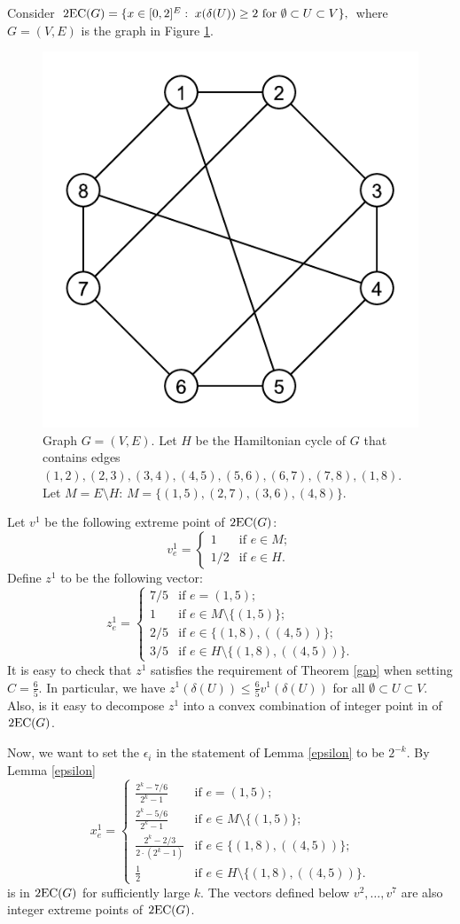 \begin{example}\label{epslimit}

Consider  $\operatorname{2EC}(G) = \{x\in [0,2]^E: \; x(\delta(U))\geq 2 \mbox{ for $\emptyset \subset U \subset V$}\},$ where $G=(V,E)$ is the graph in Figure \ref{example}. 
\begin{figure}[h]
	\centering
	\includegraphics[width=0.2\linewidth]{example.pdf}
	\caption{Graph $G=(V,E)$. Let $H$ be the Hamiltonian cycle of $G$ that contains edges $(1,2),(2,3),(3,4),(4,5),(5,6),(6,7),(7,8),(1,8)$. Let $M= E\setminus H$: $M=\{(1,5),(2,7),(3,6),(4,8)\}$.}
	\label{example}
\end{figure}

Let $v^1$ be the following extreme point of $\operatorname{2EC}(G)$: \begin{equation*}
v^1_{e} = \left\{ \begin{array}{ll}
1 & \mbox{if $e\in M$};\\
1/2 & \mbox{if $e\in H$}.
\end{array} \right. 
\end{equation*}
Define $z^1$ to be the following vector:
\begin{equation*}
z^1_{e} = \left\{ \begin{array}{ll}
7/5 & \mbox{if $e= (1,5)$};\\
1 & \mbox{if $e\in M\setminus \{(1,5)\}$};\\
2/5 & \mbox{if $e \in \{(1,8),((4,5))\}$};\\
3/5 & \mbox{if $e\in H\setminus\{(1,8),((4,5))\} $}.
\end{array} \right. 
\end{equation*}
It is easy to check that $z^1$ satisfies the requirement of Theorem \ref{gap} when setting $C=\frac{6}{5}$. In particular, we have $ z^1(\delta(U))\leq \frac{6}{5}v^1(\delta(U))$ for all $\emptyset\subset U \subset V$. Also, is it easy to decompose $z^1$ into a convex combination of integer point in of $\operatorname{2EC}(G)$.

Now, we want to set the $\epsilon_i$ in the statement of Lemma \ref{epsilon} to be $2^{-k}$. By Lemma \ref{epsilon}
\begin{equation*}
x^1_{e} = \left\{ \begin{array}{ll}
\frac{2^k-7/6}{2^k-1} & \mbox{if $e= (1,5)$};\\
\frac{2^k-5/6}{2^k-1} & \mbox{if $e\in M\setminus \{(1,5)\}$};\\
\frac{2^k- 2/3}{2\cdot (2^k-1)} & \mbox{if $e \in \{(1,8),((4,5))\}$};\\
\frac{1}{2} & \mbox{if $e\in H\setminus\{(1,8),((4,5))\} $}.
\end{array} \right. 
\end{equation*}
is in $\operatorname{2EC}(G)$ for sufficiently large $k$. The vectors defined below $v^2,\ldots,v^7$ are also integer extreme points of $\operatorname{2EC}(G)$.


\end{example}
